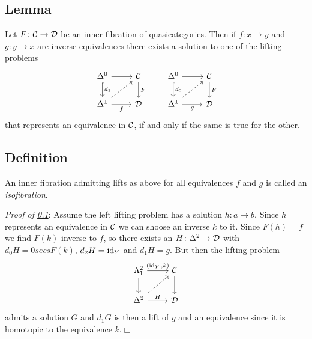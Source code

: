     \subsection{Lemma}\label{chVI-3-36}
        Let $F \colon \mathcal{C} \to \mathcal{D}$ be an inner fibration of quasicategories. Then if $f \colon x \to y$ and $g \colon y \to x$ are inverse equivalences there exists a solution to one of the lifting problems
        \begin{equation*}
            \begin{tikzcd}
                \Delta^0 \arrow[d, hook, "d_1"] \arrow[r] & \Cc \arrow[d, "F"] \\
                \Delta^1 \arrow[ru, dashed] \arrow[r, "f"'] & \Dd
            \end{tikzcd}
            \qquad
            \begin{tikzcd}
                \Delta^0 \arrow[d, hook, "d_0"] \arrow[r] & \Cc \arrow[d, "F"] \\
                \Delta^1 \arrow[ru, dashed] \arrow[r, "g"'] & \Dd
            \end{tikzcd}	
        \end{equation*}	
        that represents an equivalence in $\mathcal{C}$, if and only if the same is true for the other.

    \subsection{Definition}\label{chVI-3-37}
        An inner fibration admitting lifts as above for all equivalences $f$ and $g$ is called an \emph{isofibration}.
        \medskip

        \emph{Proof of \ref{chVI-3-36}}: Assume the left lifting problem has a solution $h \colon a \to b$. Since $h$ represents an equivalence in $\mathcal{C}$ we can shoose an inverse $k$ to it. Since $F(h) = f$ we find $F(k)$ inverse to $f$, so there exists an $H \colon \Delta^2 \to \mathcal{D}$ with $d_0 H =0 secs F(k)$, $d_2 H = \operatorname{id}_Y$ and $d_1 H = g$. But then the lifting problem
        \begin{equation*}
            \begin{tikzcd}
                \horn{2}{1} \arrow[d] \arrow[r, "(\id_Y{,} k)"] & \Cc \arrow[d] \\
                \Delta^2 \arrow[ru, dashed] \arrow[r, "H"] & \Dd
            \end{tikzcd}	
        \end{equation*}	
        admits a solution $G$ and $d_1 G$ is then a lift of $g$ and an equivalence since it is homotopic to the equivalence $k$.\hfill$\Box$

